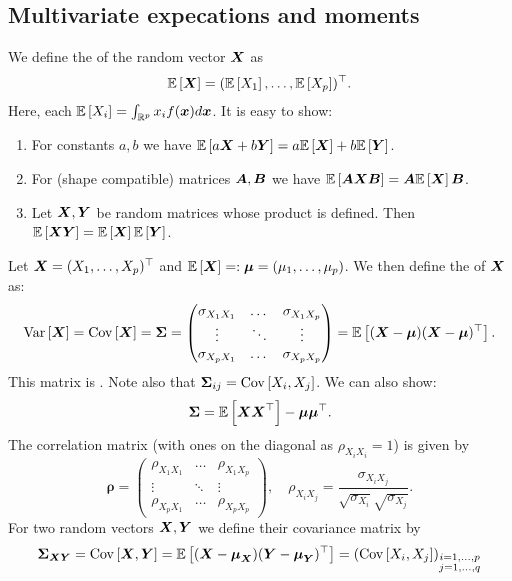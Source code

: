 \subsection{Multivariate expecations and moments}

We define the  of the random vector $\X$ as
$$
    \ev{\X} = (\ev{X_1},\dots,\ev{X_p})^\top.
$$
Here, each $\ev{X_i}=\int_{\R^p} x_i f(\x)d\x$. It is easy to show:
\begin{enumerate}
    \item For constants $a,b$ we have $\ev{a \X + b \Y} = a\ev{\X}+ b \ev{\Y}$.
    \item For (shape compatible) matrices $\mA, \mB$ we have
    $
        \ev{\mA\X \mB} = \mA\ev{\X}\mB
    $.
    \item Let $\X, \Y$ be random matrices whose product is defined. Then $\ev{\X\Y} = \ev{\X}\ev{\Y}$.   
\end{enumerate}        

Let $\X=(X_1,\dots,X_p)^\top$ and $\ev{\X}=:\M=({\mu_1,\dots,\mu_p})$. We then define the  of $\X$ as:
$$
    \var{\X} = \cov{\X} = \SS = \begin{pmatrix}
        \sigma_{X_1X_1} & \dots & \sigma_{X_1X_p} \\
        \vdots & \ddots & \vdots \\
        \sigma_{X_pX_1} & \dots & \sigma_{X_pX_p}
    \end{pmatrix}
    =\ev{(\X-\M)(\X-\M)^\top}.
$$
This matrix is . Note also that $\SS_{ij}=\cov{X_i, X_j}$. We can also show:
$$
    \SS = \ev{\X\X^\top} - \M\M^\top.
$$
The correlation matrix (with ones on the diagonal as $\rho_{X_iX_i}=1$) is given by
$$
    \boldsymbol{\rho}
    =
    \begin{pmatrix}
        \rho_{X_1X_1} & \dots & \rho_{X_1X_p} \\
        \vdots & \ddots & \vdots \\
        \rho_{X_pX_1} & \dots & \rho_{X_pX_p}
    \end{pmatrix}
    ,\quad
    \rho_{X_iX_j} = \frac{\sigma_{X_iX_j}}{\sqrt{\sigma_{X_i}}\sqrt{\sigma_{X_j}}}.
$$
For two random vectors $\X,\Y$ we define their covariance matrix by
$$
    \SS_{\X\Y} 
    = \cov{\X,\Y} 
    = \ev{(\X-\M_{\X})(\Y-\M_{\Y})^\top}
    =(\cov{X_i,X_j})_{\substack{i=1,\dots,p \\ j= 1,\dots,q}}
$$

